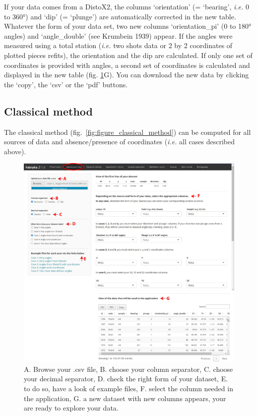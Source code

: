 \documentclass[
]{article}
\begin{document}
If your data comes from a DistoX2, the columns `orientation' (=
`bearing', \emph{i.e.} 0 to 360°) and `dip' (= `plunge') are
automatically corrected in the new table. Whatever the form of your data
set, two new columns `orientation\_pi' (0 to 180° angles) and
`angle\_double' (see Krumbein 1939) appear. If the angles were measured
using a total station (\emph{i.e.} two shots data or 2 by 2 coordinates
of plotted pieces refits), the orientation and the dip are calculated.
If only one set of coordinates is provided with angles, a second set of
coordinates is calculated and displayed in the new table (fig.
\ref{fig:figure_upload_your_data}G). You can download the new data by
clicking the `copy', the `csv' or the `pdf' buttons. \bigbreak

\subsection{Classical method}\label{classical-method-1}

The classical method (fig.~\ref{fig:figure_classical_method}) can be
computed for all sources of data and absence/presence of coordinates
(\emph{i.e.} all cases described above).

\begin{figure} [H]
\centering
  \includegraphics[width=16cm]{figure/upload_your_data.jpg}
  \caption{A. Browse your .csv file, B. choose your column separator, C. choose your decimal separator, D. check the right form of your dataset, E. to do so, have a look of example files, F. select the column needed in the application, G. a new dataset with new columns appears, your are ready to explore your data.}
\label{fig:figure_upload_your_data}
\end{figure}
\end{document}
